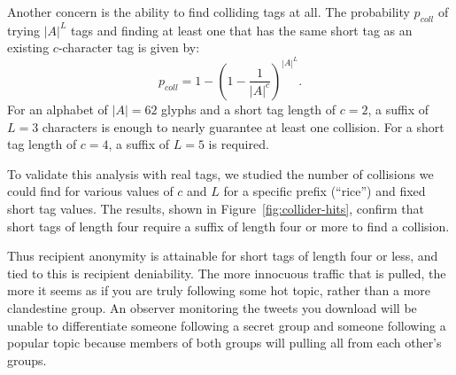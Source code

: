 Another concern is the ability to find colliding tags at all. The
probability $p_{coll}$ of trying $|A|^L$ tags and finding at least one
that has the same short tag as an existing $c$-character tag is given
by:
%
\[p_{coll} = 1-\left(1-\frac{1}{|A|^c}\right)^{|A|^L}.\]
%
For an alphabet of $|A|=62$ glyphs and a short tag length of $c=2$, a
suffix of $L=3$ characters is enough to nearly guarantee at least one
collision. For a short tag length of $c=4$, a suffix of $L=5$ is
required. 

To validate this analysis with real tags, we studied the number of
collisions we could find for various values of $c$ and $L$ for a
specific prefix (``rice'') and fixed short tag values. The results,
shown in Figure~\ref{fig:collider-hits}, confirm that short tags of
length four require a suffix of length four or more to find a collision.

Thus recipient anonymity is attainable for short tags of length four or
less, and tied to this is recipient deniability. The more innocuous
traffic that is pulled, the more it seems as if you are truly following
some hot topic, rather than a more clandestine group. An observer
monitoring the tweets you download will be unable to differentiate
someone following a secret group and someone following a popular topic
because members of both groups will pulling all \msgs from each other's
groups.
\fi


%

